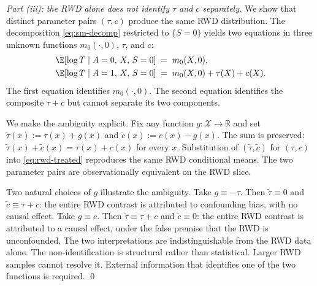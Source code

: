 \emph{Part (iii): the RWD alone does not identify $\tau$ and $c$ separately.}
We show that distinct parameter pairs $(\tau, c)$ produce the same RWD distribution.
The decomposition \eqref{eq:sm-decomp} restricted to $\{S = 0\}$ yields two equations in three unknown functions $m_0(\cdot, 0)$, $\tau$, and $c$:
\begin{align}
\E[\log T \mid A = 0,\, X,\, S = 0] &\;=\; m_0(X, 0), \label{eq:rwd-control}\\
\E[\log T \mid A = 1,\, X,\, S = 0] &\;=\; m_0(X, 0) + \tau(X) + c(X). \label{eq:rwd-treated}
\end{align}
The first equation identifies $m_0(\cdot, 0)$.
The second equation identifies the composite $\tau + c$ but cannot separate its two components.

We make the ambiguity explicit.
Fix any function $g : \mathcal{X} \to \mathbb{R}$ and set $\tilde\tau(x) := \tau(x) + g(x)$ and $\tilde c(x) := c(x) - g(x)$.
The sum is preserved: $\tilde\tau(x) + \tilde c(x) = \tau(x) + c(x)$ for every $x$.
Substitution of $(\tilde\tau, \tilde c)$ for $(\tau, c)$ into \eqref{eq:rwd-treated} reproduces the same RWD conditional means.
The two parameter pairs are observationally equivalent on the RWD slice.

Two natural choices of $g$ illustrate the ambiguity.
Take $g \equiv -\tau$.
Then $\tilde\tau \equiv 0$ and $\tilde c \equiv \tau + c$: the entire RWD contrast is attributed to confounding bias, with no causal effect.
Take $g \equiv c$.
Then $\tilde\tau \equiv \tau + c$ and $\tilde c \equiv 0$: the entire RWD contrast is attributed to a causal effect, under the false premise that the RWD is unconfounded.
The two interpretations are indistinguishable from the RWD data alone.
The non-identification is structural rather than statistical.
Larger RWD samples cannot resolve it.
External information that identifies one of the two functions is required.
\qed






